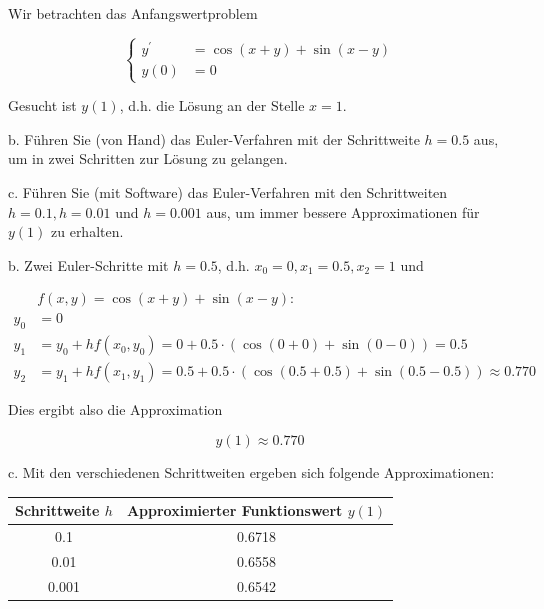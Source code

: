 \begin{example}
    Wir betrachten das Anfangswertproblem

    $$
    \left\{\begin{aligned}
    y^{\prime} & =\cos (x+y)+\sin (x-y) \\
    y(0) & =0
    \end{aligned}\right.
    $$
    
    Gesucht ist $y(1)$, d.h. die Lösung an der Stelle $x=1$.
    
    b. Führen Sie (von Hand) das Euler-Verfahren mit der Schrittweite $h=0.5$ aus, um in zwei Schritten zur Lösung zu gelangen.
    
    c. Führen Sie (mit Software) das Euler-Verfahren mit den Schrittweiten $h=0.1, h=0.01$ und $h=0.001$ aus, um immer bessere Approximationen für $y(1)$ zu erhalten.

\tcblower
b. Zwei Euler-Schritte mit $h=0.5$, d.h. $x_{0}=0, x_{1}=0.5, x_{2}=1$ und

$$
\begin{aligned}
& f(x, y)=\cos (x+y)+\sin (x-y): \\
y_{0} & =0 \\
y_{1} & =y_{0}+h f\left(x_{0}, y_{0}\right)=0+0.5 \cdot(\cos (0+0)+\sin (0-0))=0.5 \\
y_{2} & =y_{1}+h f\left(x_{1}, y_{1}\right)=0.5+0.5 \cdot(\cos (0.5+0.5)+\sin (0.5-0.5)) \approx 0.770
\end{aligned}
$$

Dies ergibt also die Approximation

$$
y(1) \approx 0.770
$$

c. Mit den verschiedenen Schrittweiten ergeben sich folgende Approximationen:

\begin{tabular}{|c|c|}
\hline Schrittweite $h$ & Approximierter Funktionswert $y(1)$ \\
\hline \hline 0.1 & 0.6718 \\
\hline 0.01 & 0.6558 \\
\hline 0.001 & 0.6542 \\
\hline
\end{tabular}
\end{example}


